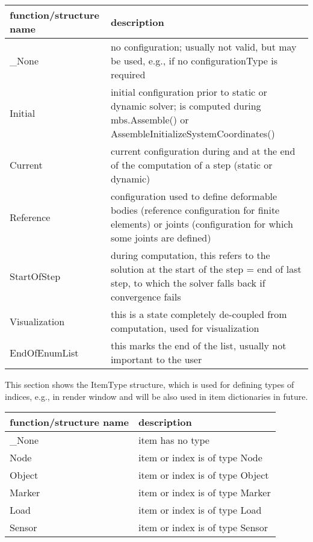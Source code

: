 \begin{center}
\footnotesize
\begin{longtable}{| p{8cm} | p{8cm} |} 
\hline
{\bf function/structure name} & {\bf description}\\ \hline
  \_None & no configuration; usually not valid, but may be used, e.g., if no configurationType is required\\ \hline  
  Initial & initial configuration prior to static or dynamic solver; is computed during mbs.Assemble() or AssembleInitializeSystemCoordinates()\\ \hline  
  Current & current configuration during and at the end of the computation of a step (static or dynamic)\\ \hline  
  Reference & configuration used to define deformable bodies (reference configuration for finite elements) or joints (configuration for which some joints are defined)\\ \hline  
  StartOfStep & during computation, this refers to the solution at the start of the step = end of last step, to which the solver falls back if convergence fails\\ \hline  
  Visualization & this is a state completely de-coupled from computation, used for visualization\\ \hline  
  EndOfEnumList & this marks the end of the list, usually not important to the user\\ \hline  
\end{longtable}
\end{center}

\label{sec:ItemType}
This section shows the ItemType structure, which is used for defining types of indices, e.g., in render window and will be also used in item dictionaries in future.



\begin{center}
\footnotesize
\begin{longtable}{| p{8cm} | p{8cm} |} 
\hline
{\bf function/structure name} & {\bf description}\\ \hline
  \_None & item has no type\\ \hline  
  Node & item or index is of type Node\\ \hline  
  Object & item or index is of type Object\\ \hline  
  Marker & item or index is of type Marker\\ \hline  
  Load & item or index is of type Load\\ \hline  
  Sensor & item or index is of type Sensor\\ \hline  
\end{longtable}
\end{center}

